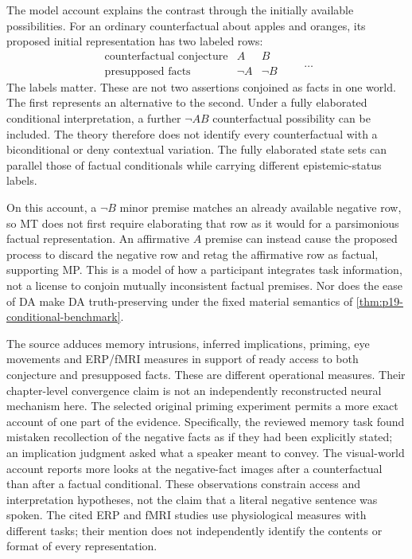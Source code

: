 The model account explains the contrast through the initially available
possibilities. For an ordinary counterfactual about apples and oranges,
its proposed initial representation has two labeled rows:
\[
\begin{array}{c|cc}
 \text{counterfactual conjecture}&A&B\\
 \text{presupposed facts}&\neg A&\neg B
\end{array}
\qquad\ldots
\]
The labels matter. These are not two assertions conjoined as facts in
one world. The first represents an alternative to the second. Under a
fully elaborated conditional interpretation, a further \(\neg AB\)
counterfactual possibility can be included. The theory therefore does
not identify every counterfactual with a biconditional or deny contextual
variation. The fully elaborated state sets can parallel those of factual
conditionals while carrying different epistemic-status labels.

On this account, a \(\neg B\) minor premise matches an already
available negative row, so MT does not first require elaborating that
row as it would for a parsimonious factual representation. An affirmative
\(A\) premise can instead cause the proposed process to discard the
negative row and retag the affirmative row as factual, supporting MP.
This is a model of how a participant integrates task information, not a
license to conjoin mutually inconsistent factual premises. Nor does the
ease of DA make DA truth-preserving under the fixed material semantics
of \cref{thm:p19-conditional-benchmark}.

The source adduces memory intrusions, inferred implications, priming,
eye movements and ERP/fMRI measures in support of ready access to both
conjecture and presupposed facts. These are different operational
measures. Their chapter-level convergence claim is not an independently
reconstructed neural mechanism here. The selected original priming
experiment permits a more exact account of one part of the evidence.
Specifically, the reviewed memory task found mistaken recollection of
the negative facts as if they had been explicitly stated; an implication
judgment asked what a speaker meant to convey. The visual-world account
reports more looks at the negative-fact images after a counterfactual
than after a factual conditional. These observations constrain access
and interpretation hypotheses, not the claim that a literal negative
sentence was spoken. The cited ERP and fMRI studies use physiological
measures with different tasks; their mention does not independently
identify the contents or format of every representation.
\cite[p.~412]{ByrneEspino2021ConditionalCounterfactual}

